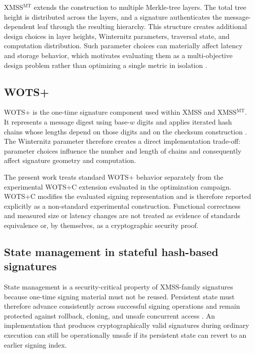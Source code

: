 \documentclass[pdflatex,sn-mathphys-num]{sn-jnl}
\begin{document}
XMSS$^{\mathrm{MT}}$ extends the construction to multiple Merkle-tree
layers. The total tree height is distributed across the layers, and a
signature authenticates the message-dependent leaf through the
resulting hierarchy. This structure creates additional design choices
in layer heights, Winternitz parameters, traversal state, and
computation distribution. Such parameter choices can materially affect
latency and storage behavior, which motivates evaluating them as a
multi-objective design problem rather than optimizing a single metric
in isolation \cite{OptimalParametersXMSSMT}.

\subsection{WOTS+}
WOTS+ is the one-time signature component used within XMSS and
XMSS$^{\mathrm{MT}}$. It represents a message digest using base-$w$
digits and applies iterated hash chains whose lengths depend on those
digits and on the checksum construction
\cite{Huelsing2013WOTSPlus,RFC8391}. The Winternitz parameter therefore
creates a direct implementation trade-off: parameter choices influence
the number and length of chains and consequently affect signature
geometry and computation.

The present work treats standard WOTS+ behavior separately from the
experimental WOTS+C extension evaluated in the optimization campaign.
WOTS+C modifies the evaluated signing representation and is therefore
reported explicitly as a non-standard experimental construction.
Functional correctness and measured size or latency changes are not
treated as evidence of standards equivalence or, by themselves, as a
cryptographic security proof.

\subsection{State management in stateful hash-based signatures}
State management is a security-critical property of XMSS-family
signatures because one-time signing material must not be reused.
Persistent state must therefore advance consistently across successful
signing operations and remain protected against rollback, cloning, and
unsafe concurrent access \cite{McGrew2016StateManagement,NIST800208}.
An implementation that produces cryptographically valid signatures
during ordinary execution can still be operationally unsafe if its
persistent state can revert to an earlier signing index.
\end{document}
